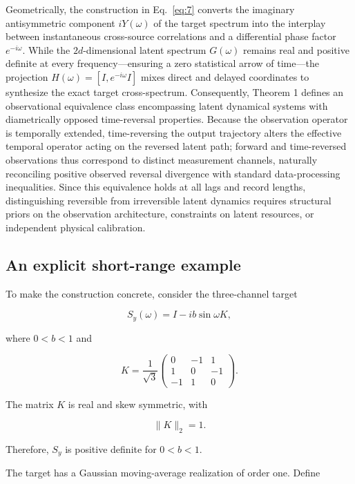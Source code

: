 \documentclass[aps,pre,reprint,amsmath,amssymb,superscriptaddress]{revtex4-2}
\begin{document}
Geometrically, the construction in Eq.~\eqref{eq:7} converts the imaginary antisymmetric component $iY(\omega)$ of the target spectrum into the interplay between instantaneous cross-source correlations and a differential phase factor $e^{-i\omega}$. While the $2d$-dimensional latent spectrum $G(\omega)$ remains real and positive definite at every frequency---ensuring a zero statistical arrow of time---the projection $H(\omega) = [I, e^{-i\omega}I]$ mixes direct and delayed coordinates to synthesize the exact target cross-spectrum.
Consequently, Theorem 1 defines an observational equivalence class encompassing latent dynamical systems with diametrically opposed time-reversal properties. Because the observation operator is temporally extended, time-reversing the output trajectory alters the effective temporal operator acting on the reversed latent path; forward and time-reversed observations thus correspond to distinct measurement channels, naturally reconciling positive observed reversal divergence with standard data-processing inequalities. Since this equivalence holds at all lags and record lengths, distinguishing reversible from irreversible latent dynamics requires structural priors on the observation architecture, constraints on latent resources, or independent physical calibration.

\subsection{An explicit short-range example}

To make the construction concrete, consider the three-channel target

\begin{equation}\label{eq:10}
\boxed{
S_y(\omega)=I-ib\sin\omega K,
}
\end{equation}

where \(0<b<1\) and

\[
K=
\frac1{\sqrt3}
\begin{pmatrix}
0&-1&1\\
1&0&-1\\
-1&1&0
\end{pmatrix}.
\]

The matrix \(K\) is real and skew symmetric, with

\[
\|K\|_2=1.
\]

Therefore, \(S_y\) is positive definite for \(0<b<1\).

The target has a Gaussian moving-average realization of order one. Define
\end{document}

